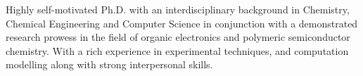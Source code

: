 

\begin{cvparagraph}

Highly self-motivated Ph.D. with an interdisciplinary background in Chemistry, Chemical Engineering and Computer Science in conjunction with a demonstrated research prowess in the field of organic electronics and polymeric semiconductor chemistry. With a rich experience in experimental techniques, and computation modelling along with strong interpersonal skills.
\end{cvparagraph}
